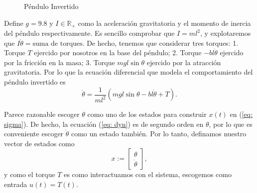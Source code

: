 \begin{figure}[!h]
\centering
{}
\caption{Péndulo Invertido}
\label{fig: invpen}
\end{figure}

Define $g = 9.8$ y $I\in\mathbb{R}_+$ como la aceleración gravitatoria y el momento de inercia del péndulo respectivamente. Es sencillo comprobar que $I = ml^2$, y explotaremos que $I \ddot\theta = \text{suma de torques}$. De hecho, tenemos que considerar tres torques: 1. Torque $T$ ejercido por nosotros en la base del péndulo; 2. Torque $-bl\dot\theta$ ejercido por la fricción en la masa; 3. Torque $mgl \sin\theta$ ejercido por la atracción gravitatoria. Por lo que la ecuación diferencial que modela el comportamiento del péndulo invertido es
\begin{equation}
\ddot\theta = \frac{1}{ml^2}\left(mgl\sin{\theta}-bl\dot\theta + T\right).
\label{eq: dyn}
\end{equation}

Parece razonable escoger $\theta$ como uno de los estados para construir $x(t)$ en (\ref{eq: sigma}). De hecho, la ecuación (\ref{eq: dyn}) es de segundo orden en $\theta$, por lo que es conveniente escoger $\dot\theta$ como un estado también. Por lo tanto, definamos nuestro vector de estados como
\begin{equation}
x := \begin{bmatrix}\theta \\ \dot\theta \end{bmatrix},
\end{equation}
y como el torque $T$ es como interactuamos con el sistema, escogemos como entrada $u(t) = T(t)$.

